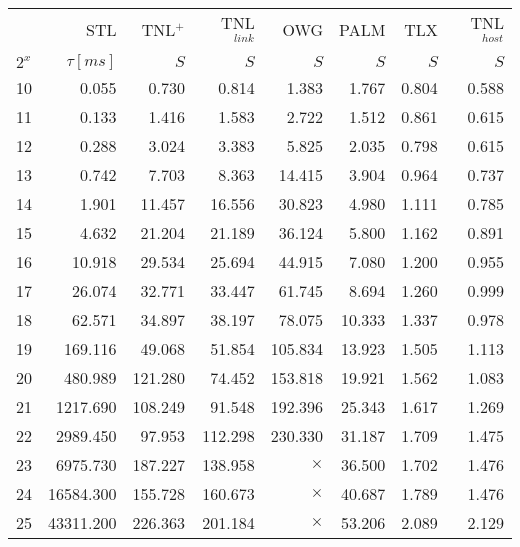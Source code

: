 \begin{tabular}{lr|rrrrrr}
  \toprule
  {}    & STL        & TNL$^+$ & TNL$^{link}$ & OWG      & PALM   & TLX   & TNL$^{host}$ \\
  $2^x$ & $\tau[ms]$ & $S$     & $S$          & $S$      & $S$    & $S$   & $S$          \\
  \midrule
  10    & 0.055      & 0.730   & 0.814        & 1.383    & 1.767  & 0.804 & 0.588        \\
  11    & 0.133      & 1.416   & 1.583        & 2.722    & 1.512  & 0.861 & 0.615        \\
  12    & 0.288      & 3.024   & 3.383        & 5.825    & 2.035  & 0.798 & 0.615        \\
  13    & 0.742      & 7.703   & 8.363        & 14.415   & 3.904  & 0.964 & 0.737        \\
  14    & 1.901      & 11.457  & 16.556       & 30.823   & 4.980  & 1.111 & 0.785        \\
  15    & 4.632      & 21.204  & 21.189       & 36.124   & 5.800  & 1.162 & 0.891        \\
  16    & 10.918     & 29.534  & 25.694       & 44.915   & 7.080  & 1.200 & 0.955        \\
  17    & 26.074     & 32.771  & 33.447       & 61.745   & 8.694  & 1.260 & 0.999        \\
  18    & 62.571     & 34.897  & 38.197       & 78.075   & 10.333 & 1.337 & 0.978        \\
  19    & 169.116    & 49.068  & 51.854       & 105.834  & 13.923 & 1.505 & 1.113        \\
  20    & 480.989    & 121.280 & 74.452       & 153.818  & 19.921 & 1.562 & 1.083        \\
  21    & 1217.690   & 108.249 & 91.548       & 192.396  & 25.343 & 1.617 & 1.269        \\
  22    & 2989.450   & 97.953  & 112.298      & 230.330  & 31.187 & 1.709 & 1.475        \\
  23    & 6975.730   & 187.227 & 138.958      & $\times$ & 36.500 & 1.702 & 1.476        \\
  24    & 16584.300  & 155.728 & 160.673      & $\times$ & 40.687 & 1.789 & 1.476        \\
  25    & 43311.200  & 226.363 & 201.184      & $\times$ & 53.206 & 2.089 & 2.129        \\
  \bottomrule
\end{tabular}


